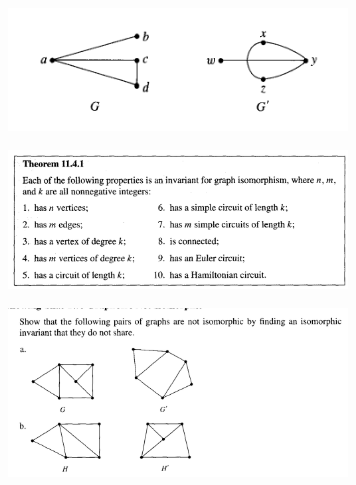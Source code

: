 \documentclass{article}
\begin{document}
\begin{figure}
\centering
\includegraphics[width=90mm]{5}
\end{figure}

\begin{figure}
\centering
\includegraphics[width=90mm]{6}
\end{figure}

\begin{figure}
\centering
\includegraphics[width=90mm]{7}
\end{figure}
\end{document}
